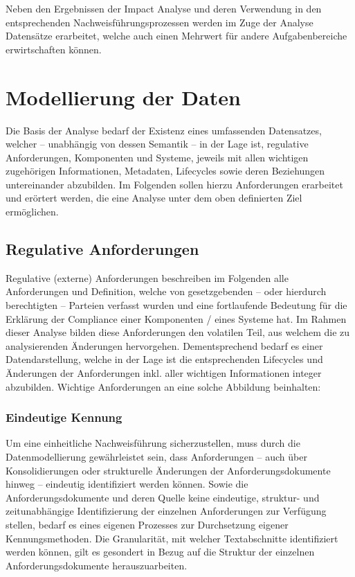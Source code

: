     \medskip
    Neben den Ergebnissen der Impact Analyse und deren Verwendung in den entsprechenden Nachweisführungsprozessen werden im Zuge der Analyse Datensätze erarbeitet, welche auch einen Mehrwert für andere Aufgabenbereiche erwirtschaften können. 


\pagebreak
\section{Modellierung der Daten} 

    Die Basis der Analyse bedarf der Existenz eines umfassenden Datensatzes, welcher -- unabhängig von dessen Semantik -- in der Lage ist, regulative Anforderungen, \atmans{} Komponenten und \atmans{} Systeme, jeweils mit allen wichtigen zugehörigen Informationen, Metadaten, Lifecycles sowie deren Beziehungen untereinander abzubilden.
    Im Folgenden sollen hierzu Anforderungen erarbeitet und erörtert werden, die eine Analyse unter dem oben definierten Ziel ermöglichen.

\subsection{Regulative Anforderungen}\label{model_anforderungen}

    Regulative (externe) Anforderungen beschreiben im Folgenden alle Anforderungen und Definition, welche von gesetzgebenden -- oder hierdurch berechtigten -- Parteien verfasst wurden und eine fortlaufende Bedeutung für die Erklärung der Compliance einer \atmans{} Komponenten / eines \atmans{} Systeme hat.   
    Im Rahmen dieser Analyse bilden diese Anforderungen den volatilen Teil, aus welchem die zu analysierenden Änderungen hervorgehen.
    Dementsprechend bedarf es einer Datendarstellung, welche in der Lage ist die entsprechenden Lifecycles und Änderungen der Anforderungen inkl. aller wichtigen Informationen integer abzubilden.   
    Wichtige Anforderungen an eine solche Abbildung beinhalten:

\subsubsection{Eindeutige Kennung}

    Um eine einheitliche Nachweisführung sicherzustellen, muss durch die Datenmodellierung gewährleistet sein, dass Anforderungen -- auch über Konsolidierungen oder strukturelle Änderungen der Anforderungsdokumente hinweg -- eindeutig identifiziert werden können.
    Sowie die Anforderungsdokumente und deren Quelle keine eindeutige, struktur- und zeitunabhängige Identifizierung der  einzelnen Anforderungen zur Verfügung stellen, bedarf es eines eigenen Prozesses zur Durchsetzung eigener Kennungsmethoden.  
    Die Granularität, mit welcher Textabschnitte identifiziert werden können, gilt es gesondert in Bezug auf die Struktur der einzelnen Anforderungsdokumente herauszuarbeiten.

